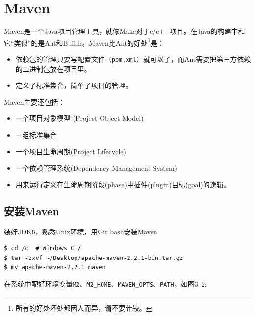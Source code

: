 \section{Maven}
\label{maven}

Maven是一个Java项目管理工具，就像Make对于c\slash c++项目。在Java的构建中和它“类似”的是Ant和Buildr。Maven比Ant的好处\footnote{所有的好处坏处都因人而异，请不要计较。}是：

\begin{itemize}
\item 依赖包的管理只要写配置文件（\texttt{pom.xml}）就可以了，而Ant需要把第三方依赖的二进制包放在项目里。

\item 定义了标准集合，简单了项目的管理。

\end{itemize}

Maven主要还包括：

\begin{itemize}
\item 一个项目对象模型 (Project Object Model)

\item 一组标准集合

\item 一个项目生命周期(Project Lifecycle)

\item 一个依赖管理系统(Dependency Management System)

\item 用来运行定义在生命周期阶段(phase)中插件(plugin)目标(goal)的逻辑。

\end{itemize}

\subsection{安装Maven}
\label{安装maven}

装好JDK6，熟悉Unix环境，用Git bash安装Maven

\begin{verbatim}
$ cd /c  # Windows C:/
$ tar -zxvf ~/Desktop/apache-maven-2.2.1-bin.tar.gz
$ mv apache-maven-2.2.1 maven
\end{verbatim}

在系统中配好环境变量\texttt{M2}、\texttt{M2\_HOME}、\texttt{MAVEN\_OPTS}、\texttt{PATH}，如图3--2:

